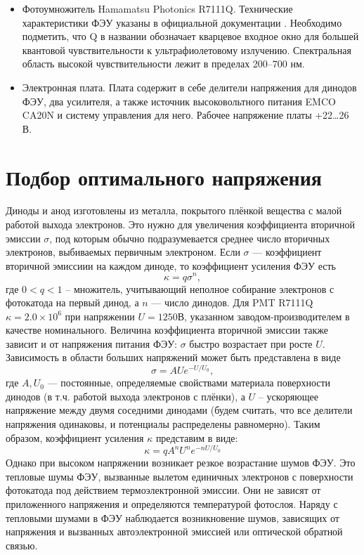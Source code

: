 \documentclass[12pt,a4paper]{report} %
\begin{document}
\begin{itemize}
	\item Фотоумножитель Hamamatsu Photonics R7111Q. Технические характеристики ФЭУ указаны в официальной документации \cite{Hamamatsu}. Необходимо подметить, что Q  в названии обозначает кварцевое входное окно для большей квантовой чувствительности к ультрафиолетовому излучению. Спектральная область высокой чувствительности лежит в пределах 200--700 нм. 
	\item Электронная плата. Плата содержит в себе делители напряжения для динодов ФЭУ, два усилителя, а также источник высоковольтного питания EMCO CA20N и систему управления для него. Рабочее напряжение платы +22\dots26 В. 
\end{itemize}

\section{Подбор оптимального напряжения}
Диноды и анод изготовлены из металла, покрытого плёнкой вещества с малой работой выхода электронов. Это нужно для увеличения коэффициента вторичной эмиссии $\sigma$, под которым обычно подразумевается среднее число вторичных электронов, выбиваемых первичным электроном. Если $\sigma$ --- коэффициент вторичной эмиссиии на каждом диноде, то коэффициент усиления ФЭУ есть 
\begin{equation}
	\kappa = q\sigma^n, 
\end{equation}
где $0 <q <1$ -- множитель, учитывающий неполное собирание электронов с фотокатода на первый динод, а $n$ --- число динодов. Для PMT R7111Q $\kappa= 2.0\times10^6$ при напряжении $U = 1250 В$, указанном заводом-производителем в качестве номинального. Величина коэффициента вторичной эмиссии также зависит и от напряжения питания ФЭУ: $\sigma$ быстро возрастает при росте $U$. Зависимость в области больших напряжений может быть представлена в виде
\begin{equation}
	\sigma = AUe^{-U/U_0},
\end{equation}
где $A, U_0$ --- постоянные, определяемые свойствами материала поверхности динодов (в т.ч. работой выхода электронов с плёнки), а $U$ -- ускоряющее напряжение между двумя соседними динодами (будем считать, что все делители напряжения одинаковы, и потенциалы распределены равномерно). Таким образом, коэффициент усиления $\kappa$ представим в виде:
\begin{equation}
	\kappa = qA^nU^ne^{-nU/U_0} 
\end{equation}
Однако при высоком напряжении возникает резкое возрастание шумов ФЭУ. Это тепловые шумы ФЭУ, вызванные вылетом единичных электронов с поверхности фотокатода под действием термоэлектронной эмиссии. Они не зависят от приложенного напряжения и определяются температурой фотослоя. Наряду с тепловыми шумами в ФЭУ наблюдается возникновение шумов, зависящих от напряжения и вызванных автоэлектронной эмиссией или оптической обратной связью.
\end{document}

